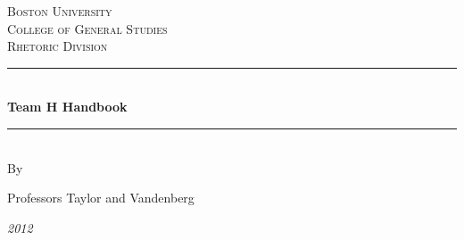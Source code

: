 \documentclass[12pt, hidelinks]{article} %
\begin{document}

\begin{titlepage}

\newcommand{\HRule}{\rule{\linewidth}{0.3mm}} %

\center %

\textsc{\LARGE Boston University}\\[1.5cm] %
\textsc{\Large College of General Studies}\\[0.5cm] %
\textsc{\large Rhetoric Division}\\[0.5cm] %

\HRule \\[0.4cm]
{ \huge \bfseries Team H Handbook}\\[0.4cm] %
\HRule \\[1.5cm]

By

Professors Taylor and Vandenberg



\vfill %
\emph{2012}\\[.5cm] 
\end{titlepage}


\tableofcontents %

\newpage %


\end{document}
